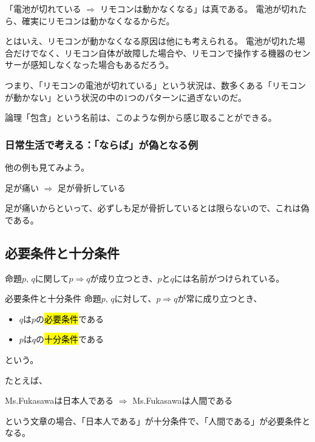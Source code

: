 \documentclass[../../imaging-math]{subfiles}
\begin{document}
「電池が切れている $\Rightarrow$ リモコンは動かなくなる」は真である。
電池が切れたら、確実にリモコンは動かなくなるからだ。

\br

とはいえ、リモコンが動かなくなる原因は他にも考えられる。
電池が切れた場合だけでなく、リモコン自体が故障した場合や、リモコンで操作する機器のセンサーが感知しなくなった場合もあるだろう。

\br

つまり、「リモコンの電池が切れている」という状況は、数多くある「リモコンが動かない」という状況の中の1つのパターンに過ぎないのだ。

論理「包含」という名前は、このような例から感じ取ることができる。

\subsubsection{日常生活で考える：「ならば」が偽となる例}

他の例も見てみよう。

\begin{center}
  足が痛い $\Rightarrow$ 足が骨折している
\end{center}

足が痛いからといって、必ずしも足が骨折しているとは限らないので、これは偽である。

\subsection{必要条件と十分条件}

命題$p, \, q$に関して$p \Rightarrow q$が成り立つとき、$p$と$q$には名前がつけられている。

\begin{definition}{必要条件と十分条件}
  \titlegap
  命題$p, \, q$に対して、$p \Rightarrow q$が常に成り立つとき、
  \begin{itemize}
    \item $q$は$p$の\hl{必要条件}である
    \item $p$は$q$の\hl{十分条件}である
  \end{itemize}
  という。
\end{definition}

たとえば、

\begin{center}
  Ms.Fukasawaは日本人である $\Rightarrow$ Ms.Fukasawaは人間である
\end{center}

という文章の場合、「日本人である」が十分条件で、「人間である」が必要条件となる。
\end{document}
